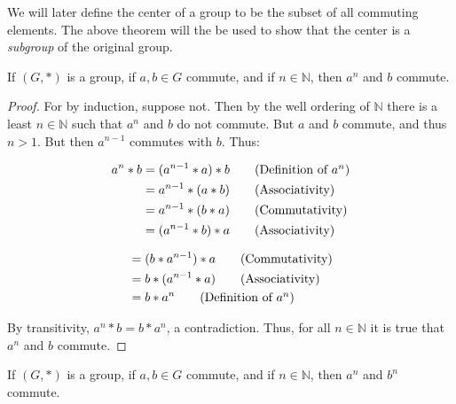     We will later define the center of a group to be the subset of all commuting
    elements. The above theorem will the be used to show that the center is a
    \textit{subgroup} of the original group.
    \begin{theorem}
        \label{thm:Group_Commuting_Elements_Have_Commuting_Powers_Part_a}%
        If $(G,*)$ is a group, if $a,b\in{G}$ commute, and if $n\in\mathbb{N}$,
        then $a^{n}$ and $b$ commute.
    \end{theorem}
    \begin{proof}
        For by induction, suppose not. Then by the well ordering of $\mathbb{N}$
        there is a least $n\in\mathbb{N}$ such that $a^{n}$ and $b$ do not
        commute. But $a$ and $b$ commute, and thus $n>1$. But then $a^{n-1}$
        commutes with $b$. Thus:
        \par
        \begin{minipage}[t]{0.52\textwidth}
            \centering
            \begin{align}
                a^{n}*b&=(a^{n-1}*a)*b
                \tag{Definition of $a^{n}$}\\
                &=a^{n-1}*(a*b)
                \tag{Associativity}\\
                &=a^{n-1}*(b*a)
                \tag{Commutativity}\\
                &=(a^{n-1}*b)*a
                \tag{Associativity}
            \end{align}
            \hfill
        \end{minipage}
        \begin{minipage}[t]{0.47\textwidth}
            \centering
            \begin{align}
                &=(b*a^{n-1})*a
                \tag{Commutativity}\\
                &=b*(a^{n-1}*a)
                \tag{Associativity}\\
                &=b*a^{n}
                \tag{Definition of $a^{n}$}
            \end{align}
        \end{minipage}
        \par\vspace{2.5ex}
        By transitivity, $a^{n}*b=b*a^{n}$, a contradiction. Thus, for all
        $n\in\mathbb{N}$ it is true that $a^{n}$ and $b$ commute.
    \end{proof}
    \begin{theorem}
        \label{thm:Group_Commuting_Elements_Have_Commuting_Powers_Part_b}%
        If $(G,*)$ is a group, if $a,b\in{G}$ commute, and if $n\in\mathbb{N}$,
        then $a^{n}$ and $b^{n}$ commute.
    \end{theorem}

